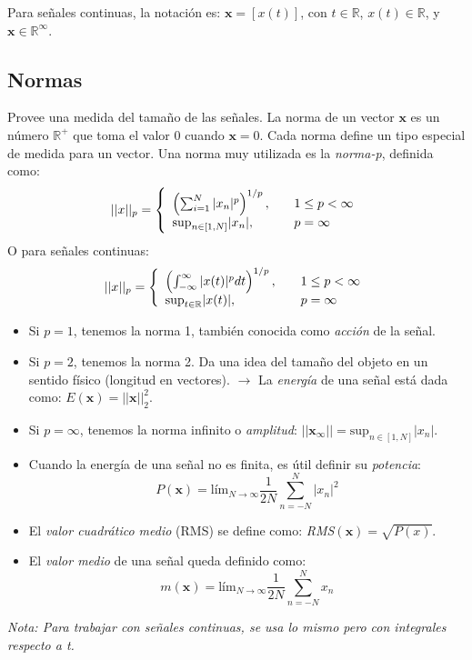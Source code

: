 \documentclass[10pt,a4paper]{book}
\begin{document}
Para señales continuas, la notación es: $\mathbf{x}=[x(t)]$, con $t \in \mathbb{R}$, $x(t) \in \mathbb{R}$, y $\mathbf{x} \in \mathbb{R}^\infty$.

\subsection{Normas}
Provee una medida del tamaño de las señales. La norma de un vector $\mathbf{x}$ es un número $\mathbb{R^+}$ que toma el valor 0 cuando $\mathbf{x}=0$. Cada norma define un tipo especial de medida para un vector. Una norma muy utilizada es la \textit{norma-p}, definida como:
\[
  ||x||_p = \left\{ 
  \begin{array}{l l}
    \left(\sum_{i=1}^N{|x_n|^p} \right)^{1/p}, & \quad 1\leq p <\infty\\
    \text{sup}_{n \in [1,N]}|x_n|, & \quad p=\infty\\
  \end{array} \right.
\]
O para señales continuas:
\[
  ||x||_p = \left\{ 
  \begin{array}{l l}
    \left(\int_{-\infty}^\infty{|x(t)|^p dt} \right)^{1/p}, & \quad 1\leq p <\infty\\
    \text{sup}_{t \in \mathbb{R}}|x(t)|, & \quad p=\infty\\
  \end{array} \right.
\]

\begin{itemize}
\item Si $p=1$, tenemos la norma 1, también conocida como \textit{acción} de la señal.
\item Si $p=2$, tenemos la norma 2. Da una idea del tamaño del objeto en un sentido físico (longitud en vectores).
\subitem $\rightarrow$ La \textit{energía} de una señal está dada como: $E(\mathbf{x})=||\mathbf{x}||_2^2$.
\item Si $p=\infty$, tenemos la norma infinito o \textit{amplitud}: $||\mathbf{x}_\infty||=\text{sup}_{n \in [1,N]}|x_n|$.
\item Cuando la energía de una señal no es finita, es útil definir su \textit{potencia}:
\[P(\mathbf{x})=\text{lím}_{N\rightarrow \infty} \frac{1}{2N}\sum_{n=-N}^N|x_n|^2 \]
\item El \textit{valor cuadrático medio} (RMS) se define como: \textit{RMS}$(\mathbf{x})=\sqrt{P(x)}$.
\item El \textit{valor medio} de una señal queda definido como:
\[m(\mathbf{x})=\text{lím}_{N\rightarrow \infty} \frac{1}{2N}\sum_{n=-N}^N x_n \]
\end{itemize}
\textit{Nota: Para trabajar con señales continuas, se usa lo mismo pero con integrales respecto a t.}
\end{document}
